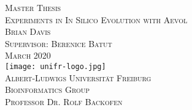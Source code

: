 \begin{titlepage}
\begin{center}
	\vspace{6em}
	{\huge \textsc{Master Thesis}}\\
	\vspace{3em}
	{\huge \textsc{Experiments in In Silico Evolution with Aevol}}\\
	\vspace{3em}
	{\Large \textsc{Brian Davis}}\\
	\vspace{2em}
	{\Large \textsc{Supervisor: Berenice Batut}}\\
	\vspace{3em}
	{\Large \textsc{March 2020}}\\
	\vspace{5em}
	\texttt{[image: unifr-logo.jpg]}\\
	\vspace{3em}
	{\Large \textsc{Albert-Ludwigs Universität Freiburg}}\\
	\vspace{2em}
	{\Large \textsc{Bioinformatics Group}}\\
	\vspace{2em}
	{\Large \textsc{Professor Dr. Rolf Backofen}}\\
\end{center}
\end{titlepage}